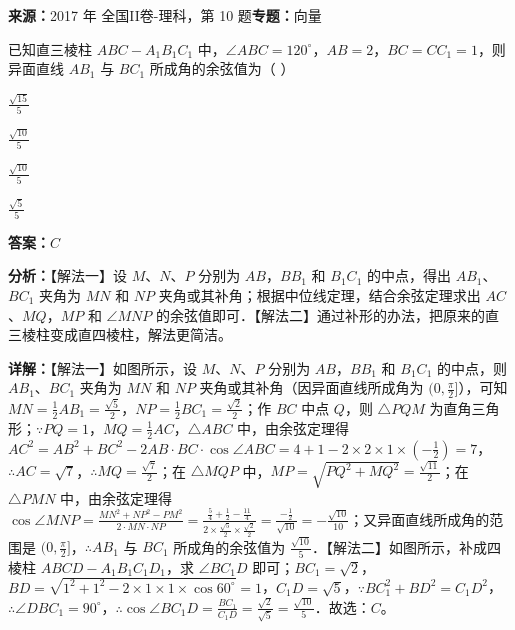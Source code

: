 \begin{question}[points=5]
\textbf{来源：}2017 年 全国II卷-理科，第 10 题\quad \textbf{专题：}向量\par
已知直三棱柱 $ABC-A_1B_1C_1$ 中，$\angle ABC=120^\circ$，$AB=2$，$BC=CC_1=1$，则异面直线 $AB_1$ 与 $BC_1$ 所成角的余弦值为（   ）
\begin{choices}
  \item $\frac{\sqrt{15}}{5}$
  \item $\frac{\sqrt{10}}{5}$
  \item $\frac{\sqrt{10}}{5}$
  \item $\frac{\sqrt{5}}{5}$
\end{choices}
\begin{solution}
\textbf{答案：}$C$

\textbf{分析：}【解法一】设 $M$、$N$、$P$ 分别为 $AB$，$BB_1$ 和 $B_1C_1$ 的中点，得出 $AB_1$、$BC_1$ 夹角为 $MN$ 和 $NP$ 夹角或其补角；根据中位线定理，结合余弦定理求出 $AC$、$MQ$，$MP$ 和 $\angle MNP$ 的余弦值即可．【解法二】通过补形的办法，把原来的直三棱柱变成直四棱柱，解法更简洁。

\textbf{详解：}【解法一】如图所示，设 $M$、$N$、$P$ 分别为 $AB$，$BB_1$ 和 $B_1C_1$ 的中点，则 $AB_1$、$BC_1$ 夹角为 $MN$ 和 $NP$ 夹角或其补角（因异面直线所成角为 $(0,\frac{\pi}{2}]$），可知 $MN=\frac{1}{2}AB_1=\frac{\sqrt{5}}{2}$，$NP=\frac{1}{2}BC_1=\frac{\sqrt{2}}{2}$；作 $BC$ 中点 $Q$，则 $\triangle PQM$ 为直角三角形；$\because PQ=1$，$MQ=\frac{1}{2}AC$，$\triangle ABC$ 中，由余弦定理得 $AC^2=AB^2+BC^2-2AB\cdot BC\cdot\cos\angle ABC=4+1-2\times2\times1\times(-\frac{1}{2})=7$，$\therefore AC=\sqrt{7}$，$\therefore MQ=\frac{\sqrt{7}}{2}$；在 $\triangle MQP$ 中，$MP=\sqrt{PQ^2+MQ^2}=\frac{\sqrt{11}}{2}$；在 $\triangle PMN$ 中，由余弦定理得 $\cos\angle MNP=\frac{MN^2+NP^2-PM^2}{2\cdot MN\cdot NP}=\frac{\frac{5}{4}+\frac{1}{2}-\frac{11}{4}}{2\times\frac{\sqrt{5}}{2}\times\frac{\sqrt{2}}{2}}=\frac{-\frac{1}{2}}{\sqrt{10}}=-\frac{\sqrt{10}}{10}$；又异面直线所成角的范围是 $(0,\frac{\pi}{2}]$，$\therefore AB_1$ 与 $BC_1$ 所成角的余弦值为 $\frac{\sqrt{10}}{5}$．【解法二】如图所示，补成四棱柱 $ABCD-A_1B_1C_1D_1$，求 $\angle BC_1D$ 即可；$BC_1=\sqrt{2}$，$BD=\sqrt{1^2+1^2-2\times1\times1\times\cos60^\circ}=1$，$C_1D=\sqrt{5}$，$\because BC_1^2+BD^2=C_1D^2$，$\therefore\angle DBC_1=90^\circ$，$\therefore\cos\angle BC_1D=\frac{BC_1}{C_1D}=\frac{\sqrt{2}}{\sqrt{5}}=\frac{\sqrt{10}}{5}$．故选：$C$。
\end{solution}
\end{question}

